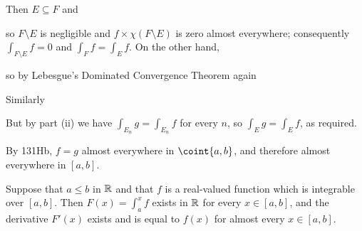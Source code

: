 {
     
\noindent Then $E\subseteq F$ and
     
     
\noindent so $F\setminus E$ is negligible and
$f\times\chi(F\setminus E)$ is zero almost everywhere;  consequently $\int_{F\setminus E}f=0$
and $\int_Ff=\int_Ef$.  On the other hand,
     
     
\noindent so by Lebesgue's Dominated Convergence Theorem again
     
     
\noindent Similarly
     
     
\noindent But by part (ii) we have $\int_{E_n}g=\int_{E_n}f$ for every
$n$, so $\int_Eg=\int_Ef$, as required.\ \Qed
     
By 131Hb, $f=g$ almost everywhere in $\coint{a,b}$, and therefore almost everywhere in $[a,b]$.
}%
     
 Suppose that $a\le b$ in $\Bbb R$ and that $f$ is
a real-valued function which is integrable over $[a,b]$.
Then $F(x)=\int_a^xf$ exists in $\Bbb R$ for every $x\in [a,b]$, and the derivative
$F'(x)$ exists and is equal to $f(x)$ for almost every $x\in[a,b]$.
     
